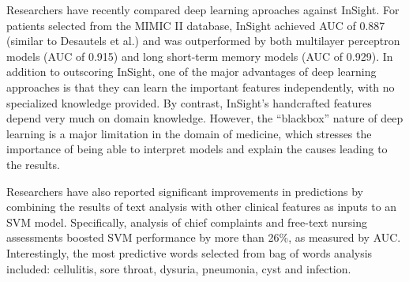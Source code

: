 \documentclass{amia}
\begin{document}
	 Researchers have recently 
	compared deep learning aproaches against InSight.\cite{kam2017}
	 For patients selected from the MIMIC II database, InSight
	achieved AUC of 0.887 (similar to Desautels et al.) and was
	outperformed by both multilayer perceptron models (AUC of 0.915) 
        and long short-term memory models (AUC of
	0.929).  
	 In addition to outscoring InSight, one of the major
	advantages of deep learning approaches is that they can
	learn the important features independently, with no specialized
	knowledge provided.  
	 By contrast, InSight's handcrafted features depend very much 
	on domain knowledge.  
	 However, the ``blackbox'' nature of
	deep learning is a major limitation in the domain of medicine,
	which stresses the importance of being able to interpret
	models and explain the causes leading to the results.\cite{kam2017}

	Researchers have also reported significant improvements
        in predictions by combining 
	the results of text analysis with other clinical features
	as inputs to an SVM model.\cite{horng2017}  
	Specifically, analysis of chief complaints 
	and free-text nursing assessments boosted SVM performance
        by more than 26\%, as measured by AUC.
	Interestingly, the most predictive words selected from bag of words 
	analysis included: cellulitis, sore throat, dysuria, pneumonia, 
	cyst and infection.  
\end{document}
